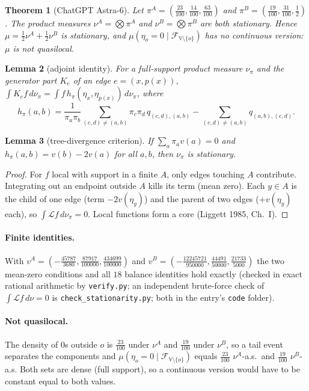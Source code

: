 \documentclass[11pt]{article}
\newtheorem{theorem}{Theorem}
\newtheorem{lemma}[theorem]{Lemma}
\newcommand{\cL}{\mathscr{L}}
\begin{document}
\begin{theorem}[ChatGPT Astra-6]
Let $\pi^A=(\frac{23}{100},\frac{14}{100},\frac{63}{100})$ and $\pi^B=(\frac{19}{100},\frac{31}{100},\frac12)$. The product measures $\nu^A=\bigotimes\pi^A$ and $\nu^B=\bigotimes\pi^B$ are both stationary. Hence $\mu=\frac12\nu^A+\frac12\nu^B$ is stationary, and $\mu(\eta_o=0\mid\mathcal F_{\mathbb V\setminus\{o\}})$ has no continuous version: $\mu$ is not quasilocal.
\end{theorem}

\begin{lemma}[adjoint identity]\label{lem:adj}
For a full-support product measure $\nu_\pi$ and the generator part $K_e$ of an edge $e=(x,p(x))$,
$\int K_ef\,d\nu_\pi=\int f\,h_\pi(\eta_x,\eta_{p(x)})\,d\nu_\pi$, where
\[
h_\pi(a,b)=\frac1{\pi_a\pi_b}\sum_{(c,d)\ne(a,b)}\pi_c\pi_d\,q_{(c,d),(a,b)}-\sum_{(c,d)\ne(a,b)}q_{(a,b),(c,d)} .
\]
\end{lemma}

\begin{lemma}[tree-divergence criterion]
If $\sum_a\pi_av(a)=0$ and $h_\pi(a,b)=v(b)-2v(a)$ for all $a,b$, then $\nu_\pi$ is stationary.
\end{lemma}
\begin{proof}
For $f$ local with support in a finite $A$, only edges touching $A$ contribute. Integrating out an endpoint outside $A$ kills its term (mean zero). Each $y\in A$ is the child of one edge (term $-2v(\eta_y)$) and the parent of two edges ($+v(\eta_y)$ each), so $\int\cL f\,d\nu_\pi=0$. Local functions form a core (Liggett 1985, Ch.~I).
\end{proof}

\paragraph{Finite identities.} With $v^A=(-\frac{45787}{3680},\frac{87917}{100000},\frac{434699}{100000})$ and $v^B=(-\frac{12245721}{950000},\frac{44491}{50000},\frac{21733}{5000})$ the two mean-zero conditions and all $18$ balance identities hold exactly (checked in exact rational arithmetic by \texttt{verify.py}; an independent brute-force check of $\int\cL f\,d\nu=0$ is \texttt{check\_stationarity.py}; both in the entry's \texttt{code} folder).

\paragraph{Not quasilocal.} The density of $0$s outside $o$ is $\frac{23}{100}$ under $\nu^A$ and $\frac{19}{100}$ under $\nu^B$, so a tail event separates the components and $\mu(\eta_o=0\mid\mathcal F_{\mathbb V\setminus\{o\}})$ equals $\frac{23}{100}$ $\nu^A$-a.s.\ and $\frac{19}{100}$ $\nu^B$-a.s. Both sets are dense (full support), so a continuous version would have to be constant equal to both values.
\end{document}
